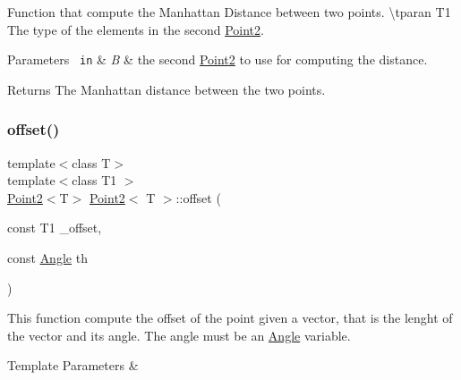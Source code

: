 Function that compute the Manhattan Distance between two points. \textbackslash{}tparan T1 The type of the elements in the second {\ttfamily \mbox{\hyperlink{class_point2}{Point2}}}. 


\begin{DoxyParams}[1]{Parameters}
\mbox{\texttt{ in}}  & {\em B} & the second {\ttfamily \mbox{\hyperlink{class_point2}{Point2}}} to use for computing the distance. \\
\hline
\end{DoxyParams}
\begin{DoxyReturn}{Returns}
The Manhattan distance between the two points. 
\end{DoxyReturn}
\mbox{\label{class_point2_a1c49ae936487b2f7b72682ba97eed1cb}} 
\subsubsection{\texorpdfstring{offset()}{offset()}\hspace{0.1cm}{\footnotesize\ttfamily [1/3]}}
{\footnotesize\ttfamily template$<$class T$>$ \\
template$<$class T1 $>$ \\
\mbox{\hyperlink{class_point2}{Point2}}$<$T$>$ \mbox{\hyperlink{class_point2}{Point2}}$<$ T $>$\+::offset (\begin{DoxyParamCaption}\item[{const T1}]{\+\_\+offset,  }\item[{const \mbox{\hyperlink{class_angle}{Angle}}}]{th }\end{DoxyParamCaption})\hspace{0.3cm}{\ttfamily [inline]}}



This function compute the offset of the point given a vector, that is the lenght of the vector and its angle. The angle must be an {\ttfamily \mbox{\hyperlink{class_angle}{Angle}}} variable. 


\begin{DoxyTemplParams}{Template Parameters}
{\em } & \\
\hline
\end{DoxyTemplParams}
\mbox{\label{class_point2_a45882a15db20f34b2d062d7f11a135cd}} 
